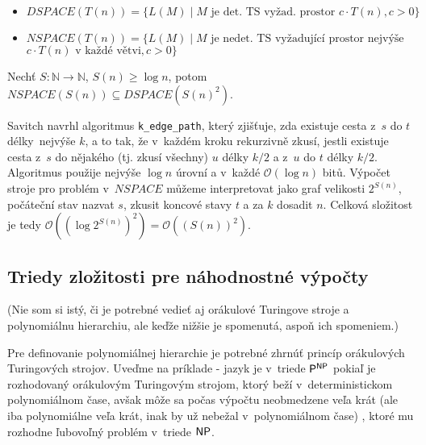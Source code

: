 \begin{itemize}
    \item $DSPACE(T(n)) = \{ L(M) \mid \text{$M$ je det. TS vyžad.
        prostor } c \cdot T(n), c > 0 \}$
    \item $NSPACE(T(n)) = \{ L(M) \mid \text{$M$ je nedet. TS vyžadující
        prostor nejvýše}$ $c \cdot T(n) \text{ v~každé větvi}, c > 0 \}$
\end{itemize}

\begin{theorem}[Savitch]
    Nechť $S : \mathbb{N} \to \mathbb{N}$, $S(n) \geq \log n$,
    potom $NSPACE(S(n)) \subseteq DSPACE(S(n)^2)$.
\end{theorem}

Savitch navrhl algoritmus \verb|k_edge_path|,
který zjišťuje, zda existuje cesta z~$s$ do $t$ délky~nejvýše $k$, a to
tak, že v~každém kroku rekurzivně zkusí, jestli existuje cesta z~$s$ do
nějakého (tj. zkusí všechny) $u$ délky $k/2$ a z~$u$ do $t$ délky $k/2$.
Algoritmus použije nejvýše $\log n$ úrovní a v~každé
$\mathcal{O}(\log n)$ bitů.
Výpočet stroje pro problém v~$NSPACE$ můžeme interpretovat jako graf
velikosti $2^{S(n)}$, počáteční stav nazvat $s$, zkusit koncové stavy
$t$ a za $k$ dosadit $n$. Celková složitost je tedy
$\mathcal{O}((\log 2^{S(n)})^2) = \mathcal{O}((S(n))^2)$.

\subsection{Triedy zložitosti pre náhodnostné výpočty}

(Nie som si istý, či je potrebné vedieť aj orákulové Turingove stroje
a polynomiálnu hierarchiu, ale keďže nižšie je spomenutá, aspoň ich spomeniem.)

Pre definovanie polynomiálnej hierarchie je potrebné zhrnúť princíp
orákulových Turingových strojov. Uveďme na príklade - jazyk je v~triede
${\mathsf{P}}^{{\mathsf{NP}}}$ pokiaľ je rozhodovaný orákulovým Turingovým strojom,
ktorý beží v~deterministickom polynomiálnom čase, avšak môže sa počas
výpočtu neobmedzene veľa krát (ale iba polynomiálne veľa krát, inak by
už nebežal v~polynomiálnom čase) , ktoré mu 
rozhodne ľubovoľný problém v~triede ${\mathsf{NP}}$.


